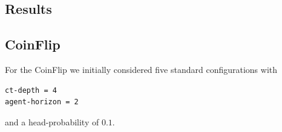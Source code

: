 \documentclass{article}
\let\Oldsection\section
\renewcommand{\section}{\FloatBarrier\Oldsection}
\let\Oldsubsection\subsection
\renewcommand{\subsection}{\FloatBarrier\Oldsubsection}
\begin{document}
\begin{flushleft}

\newcommand{\one}[1]{
\addplot table [x=cycle, y expr=\thisrow{total reward}/(\thisrow{cycle}-1), col sep=comma] {#1};
}

\newcommand{\avg}[1]{
\addplot table [x=cycle, y expr=\thisrow{winavg}, col sep=comma] {#1};
}


\newcommand{\five}[1]{
\one{../logs/short/o-#1.csv}
\addlegendentry{Always Exploit}
\one{../logs/short/r-#1.csv}
\addlegendentry{Always Random}
\one{../logs/short/0.1-#1.csv}
\addlegendentry{0.1 Explore}
\one{../logs/short/95d-#1.csv}
\addlegendentry{0.95 Decay}
\one{../logs/short/p-#1.csv}
\addlegendentry{Real Env}
}

\def \stdAO {
legend pos = south east, 
cycle list={cyan,magenta,teal,orange,violet,brown,black,pink,yellow,lime,red,green,blue,olive,purple,black!50!white},
width=40em, %
height=20em,
no marks
}

\def \stdAOM {
legend pos = outer north east, 
cycle list={cyan,magenta,teal,orange,violet,brown,black,pink,yellow,lime,red,green,blue,olive,purple,black!50!white},
width=34em, %
height=20em,
no marks
}

\newcommand{\cpt}[1]{
\caption{Average reward vs. time for #1}
}

\section{Results}

\subsection{CoinFlip}

For the CoinFlip we initially considered five standard 
configurations with
\begin{verbatim}
ct-depth = 4
agent-horizon = 2
\end{verbatim}
and a head-probability of $0.1$.


\end{flushleft}
\end{document}
